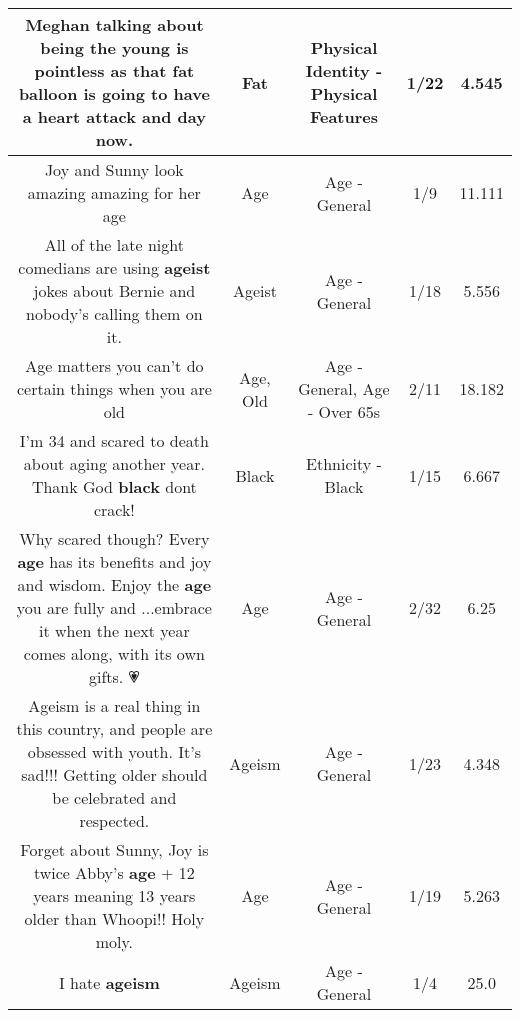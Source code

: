 \documentclass[11pt]{article}
\newlength\mylength
\begin{document}
\begin{center}
\begin{longtable}{|C{.65\mylength}|C{.30\mylength}|C{.12\mylength}|C{.12\mylength}|C{.12\mylength}|}
  \small Meghan talking about being the young is pointless as that \textbf{fat} balloon is going to have a heart attack and day now.\normalsize   & Fat & Physical Identity - Physical Features & 1/22 & 4.545 \\  \hline
  \small Joy and Sunny look amazing amazing for her age\normalsize   & Age & Age - General & 1/9 & 11.111 \\  \hline
  \small All of the late night comedians are using \textbf{ageist} jokes about Bernie and nobody's calling them on it.\normalsize   & Ageist & Age - General & 1/18 & 5.556 \\  \hline
  \small Age matters you can't do certain things when you are old\normalsize   & Age, Old & Age - General, Age - Over 65s & 2/11 & 18.182 \\  \hline
  \small I'm 34 and scared to death about aging another year.  Thank God \textbf{black} dont crack!\normalsize   & Black & Ethnicity - Black & 1/15 & 6.667 \\  \hline
  \small Why scared though? Every \textbf{age} has its benefits and joy and wisdom. Enjoy the \textbf{age} you are fully and ...embrace it when the next year comes along, with its own gifts. 💗\normalsize   & Age & Age - General & 2/32 & 6.25 \\  \hline
  \small Ageism is a real thing in this country, and people are obsessed with youth. It's sad!!! Getting older should be celebrated and respected.\normalsize   & Ageism & Age - General & 1/23 & 4.348 \\  \hline
  \small Forget about Sunny, Joy is twice Abby's \textbf{age} + 12 years meaning 13 years older than Whoopi!! Holy moly.\normalsize   & Age & Age - General & 1/19 & 5.263 \\  \hline
  \small I hate \textbf{ageism} 😤\normalsize   & Ageism & Age - General & 1/4 & 25.0 \\  \hline

\end{longtable}
\end{center}
\end{document}
